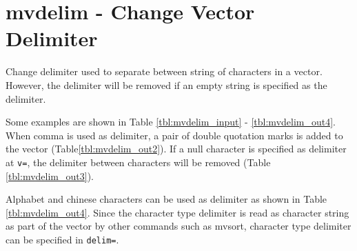 
%

\section{mvdelim - Change Vector Delimiter\label{sect:mvdelim}}
Change delimiter used to separate between string of characters in a vector. However, the delimiter will be removed if an empty string is specified as the delimiter. 

Some examples are shown in Table \ref{tbl:mvdelim_input} - \ref{tbl:mvdelim_out4}. When comma is used as delimiter, a pair of double quotation marks is added to the vector (Table\ref{tbl:mvdelim_out2}). If a null character is specified as delimiter at \verb|v=|, the delimiter between characters will be removed (Table \ref{tbl:mvdelim_out3}).   

Alphabet and chinese characters can be used as delimiter as shown in Table \ref{tbl:mvdelim_out4}. Since the character type delimiter is read as character string as part of the vector by other commands such as mvsort, character type delimiter can be specified in \verb|delim=|. 


